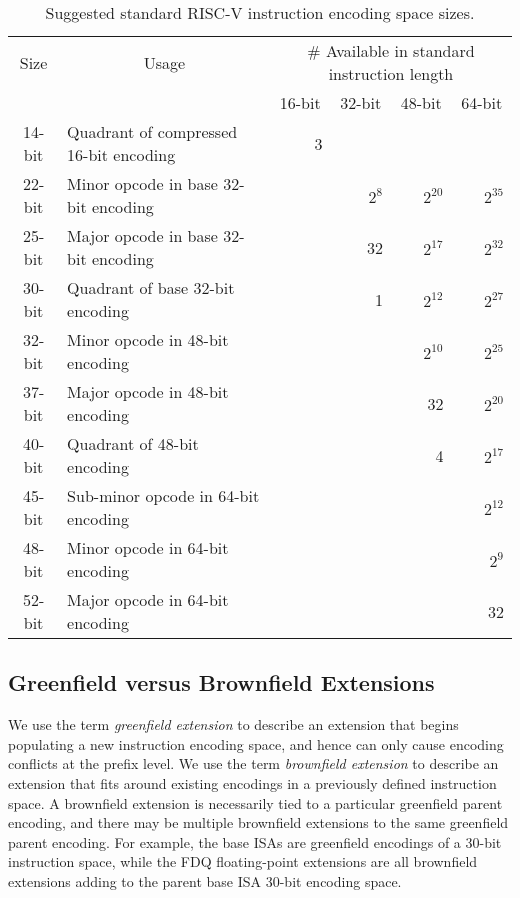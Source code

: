 \begin{table}[H]
\begin{center}
\begin{tabular}{|c|l|r|r|r|r|}
\hline
\multicolumn{1}{|c|}{Size} & \multicolumn{1}{|c|}{Usage} &
\multicolumn{4}{|c|}{\# Available in standard instruction length} \\ \cline{3-6}
 & &
\multicolumn{1}{|c|}{16-bit} &
\multicolumn{1}{|c|}{32-bit} &
\multicolumn{1}{|c|}{48-bit} &
\multicolumn{1}{|c|}{64-bit} \\ \hline \hline
14-bit & Quadrant of compressed 16-bit encoding & 3       &         &         &         \\ \hline \hline
22-bit & Minor opcode in base 32-bit encoding   &         & $2^{8}$ & $2^{20}$ & $2^{35}$ \\ \hline
25-bit & Major opcode in base 32-bit encoding   &         &      32 & $2^{17}$ & $2^{32}$ \\ \hline
30-bit & Quadrant of base 32-bit encoding       &         &       1 & $2^{12}$ & $2^{27}$ \\ \hline \hline
32-bit & Minor opcode in 48-bit encoding        &         &         & $2^{10}$ & $2^{25}$ \\ \hline
37-bit & Major opcode in 48-bit encoding        &         &         &       32 & $2^{20}$ \\ \hline
40-bit & Quadrant of 48-bit encoding            &         &         &        4 & $2^{17}$ \\ \hline \hline
45-bit & Sub-minor opcode in 64-bit encoding    &         &         &          & $2^{12}$ \\ \hline
48-bit & Minor opcode in 64-bit encoding        &         &         &          & $2^{9}$  \\ \hline
52-bit & Major opcode in 64-bit encoding        &         &         &          &      32\\ \hline
\end{tabular}
\end{center}
\caption{Suggested standard RISC-V instruction encoding space sizes.}
\label{encodingspaces}
\end{table}

\vspace{-0.2in}
\subsection*{Greenfield versus Brownfield Extensions}

We use the term {\em greenfield extension} to describe an extension
that begins populating a new instruction encoding space, and hence can
only cause encoding conflicts at the prefix level.  We use the term
{\em brownfield extension} to describe an extension that fits around
existing encodings in a previously defined instruction space.  A
brownfield extension is necessarily tied to a particular greenfield
parent encoding, and there may be multiple brownfield extensions to
the same greenfield parent encoding.  For example, the base ISAs are
greenfield encodings of a 30-bit instruction space, while the FDQ
floating-point extensions are all brownfield extensions adding to the
parent base ISA 30-bit encoding space.

